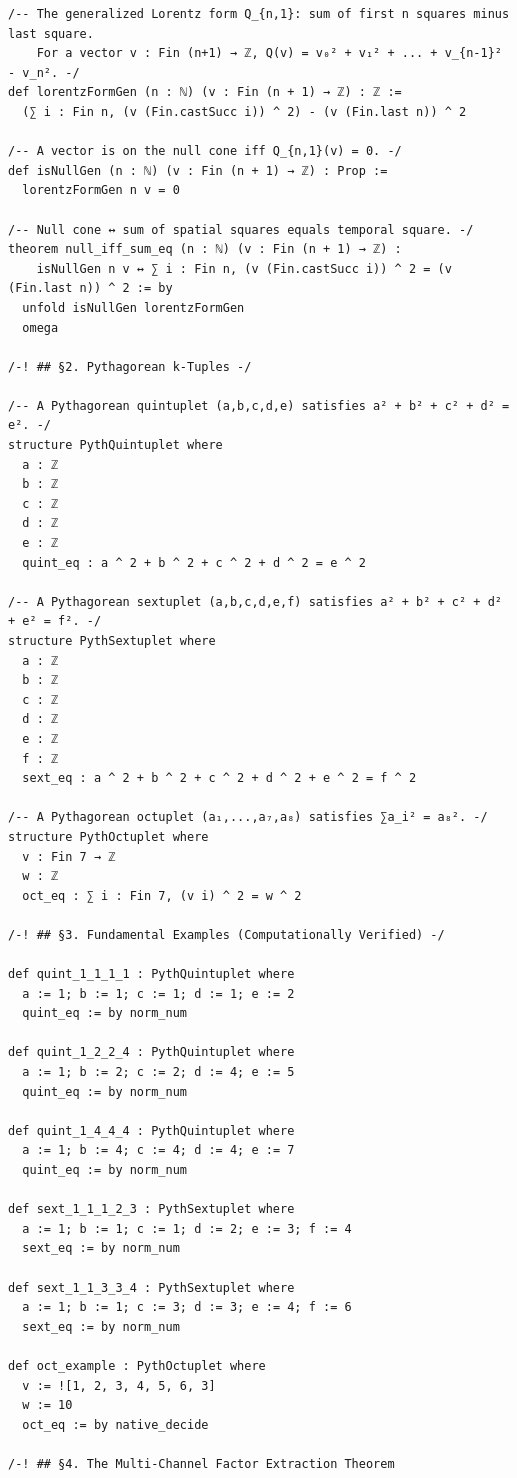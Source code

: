 \documentclass[11pt,openany]{book}
\theoremstyle{definition}
\theoremstyle{plain}
\theoremstyle{remark}
\begin{document}
\begin{lstlisting}[style=lean]
/-- The generalized Lorentz form Q_{n,1}: sum of first n squares minus last square.
    For a vector v : Fin (n+1) → ℤ, Q(v) = v₀² + v₁² + ... + v_{n-1}² - v_n². -/
def lorentzFormGen (n : ℕ) (v : Fin (n + 1) → ℤ) : ℤ :=
  (∑ i : Fin n, (v (Fin.castSucc i)) ^ 2) - (v (Fin.last n)) ^ 2

/-- A vector is on the null cone iff Q_{n,1}(v) = 0. -/
def isNullGen (n : ℕ) (v : Fin (n + 1) → ℤ) : Prop :=
  lorentzFormGen n v = 0

/-- Null cone ↔ sum of spatial squares equals temporal square. -/
theorem null_iff_sum_eq (n : ℕ) (v : Fin (n + 1) → ℤ) :
    isNullGen n v ↔ ∑ i : Fin n, (v (Fin.castSucc i)) ^ 2 = (v (Fin.last n)) ^ 2 := by
  unfold isNullGen lorentzFormGen
  omega

/-! ## §2. Pythagorean k-Tuples -/

/-- A Pythagorean quintuplet (a,b,c,d,e) satisfies a² + b² + c² + d² = e². -/
structure PythQuintuplet where
  a : ℤ
  b : ℤ
  c : ℤ
  d : ℤ
  e : ℤ
  quint_eq : a ^ 2 + b ^ 2 + c ^ 2 + d ^ 2 = e ^ 2

/-- A Pythagorean sextuplet (a,b,c,d,e,f) satisfies a² + b² + c² + d² + e² = f². -/
structure PythSextuplet where
  a : ℤ
  b : ℤ
  c : ℤ
  d : ℤ
  e : ℤ
  f : ℤ
  sext_eq : a ^ 2 + b ^ 2 + c ^ 2 + d ^ 2 + e ^ 2 = f ^ 2

/-- A Pythagorean octuplet (a₁,...,a₇,a₈) satisfies ∑a_i² = a₈². -/
structure PythOctuplet where
  v : Fin 7 → ℤ
  w : ℤ
  oct_eq : ∑ i : Fin 7, (v i) ^ 2 = w ^ 2

/-! ## §3. Fundamental Examples (Computationally Verified) -/

def quint_1_1_1_1 : PythQuintuplet where
  a := 1; b := 1; c := 1; d := 1; e := 2
  quint_eq := by norm_num

def quint_1_2_2_4 : PythQuintuplet where
  a := 1; b := 2; c := 2; d := 4; e := 5
  quint_eq := by norm_num

def quint_1_4_4_4 : PythQuintuplet where
  a := 1; b := 4; c := 4; d := 4; e := 7
  quint_eq := by norm_num

def sext_1_1_1_2_3 : PythSextuplet where
  a := 1; b := 1; c := 1; d := 2; e := 3; f := 4
  sext_eq := by norm_num

def sext_1_1_3_3_4 : PythSextuplet where
  a := 1; b := 1; c := 3; d := 3; e := 4; f := 6
  sext_eq := by norm_num

def oct_example : PythOctuplet where
  v := ![1, 2, 3, 4, 5, 6, 3]
  w := 10
  oct_eq := by native_decide

/-! ## §4. The Multi-Channel Factor Extraction Theorem


\end{lstlisting}
\end{document}
